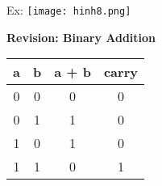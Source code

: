 \documentclass[10pt]{article}
\begin{document}
	Ex:
	\texttt{[image: hinh8.png]}
	\bigbreak

	\textbf{Revision: Binary Addition } \\
	\begin{tabular}{|c|c|c|c|}
	\hline 
	a & b & a + b & carry \\
	\hline 
	0 & 0 & 0 & 0 \\
	\hline
	0 & 1 & 1 & 0 \\
	\hline
	1 & 0 & 1 & 0 \\
	\hline
	1 & 1 & 0 & 1 \\
	\hline
	\end{tabular}

	
\end{document}
